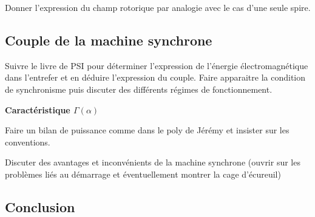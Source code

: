 Donner l'expression du champ rotorique par analogie avec le cas d'une seule spire.

\subsection{Couple de la machine synchrone}

Suivre le livre de PSI pour déterminer l'expression de l'énergie électromagnétique dans l'entrefer et en déduire l'expression du couple.
Faire apparaitre la condition de synchronisme puis discuter des différents régimes de fonctionnement. 

\begin{slide}
\textbf{Caractéristique $\Gamma(\alpha)$}
\end{slide}

Faire un bilan de puissance comme dans le poly de Jérémy et insister sur les conventions.

Discuter des avantages et inconvénients de la machine synchrone (ouvrir sur les problèmes liés au démarrage et éventuellement montrer la cage d'écureuil)

\subsection*{Conclusion}

\newpage
